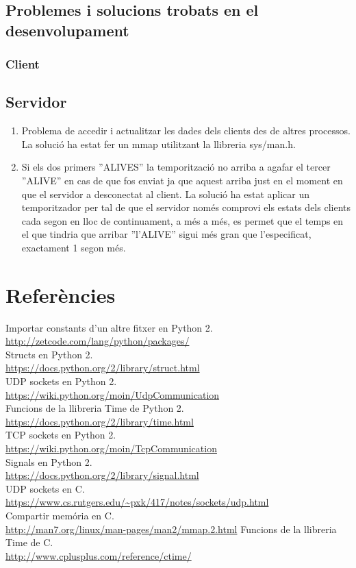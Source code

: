 \documentclass[11pt]{article}
\begin{document}
	\subsection{Problemes i solucions trobats en el desenvolupament}
		\subsubsection*{Client}
		\subsection*{Servidor}
\begin{enumerate}
\item Problema de accedir i actualitzar les dades dels clients des de altres processos. La solució ha estat fer un mmap utilitzant la llibreria sys/man.h. 
\item Si els dos primers ''ALIVES'' la temporització no arriba a agafar el tercer ''ALIVE'' en cas de que fos enviat ja que aquest arriba just en el moment en que el servidor a desconectat al client. La solució ha estat aplicar un temporitzador per tal de que el servidor només comprovi els estats dels clients cada segon en lloc de continuament, a més a més, es permet que el temps en el que tindria que arribar ''l'ALIVE'' sigui més gran que l'especificat, exactament 1 segon més.
\end{enumerate}
\newpage
\section{Referències}
Importar constants d'un altre fitxer en Python 2.\\
\url{http://zetcode.com/lang/python/packages/}\\
Structs en Python 2.\\
\url{https://docs.python.org/2/library/struct.html}\\
UDP sockets en Python 2.\\
\url{https://wiki.python.org/moin/UdpCommunication}\\
Funcions de la llibreria Time de Python 2.\\	
\url{https://docs.python.org/2/library/time.html}\\
TCP sockets en Python 2.\\
\url{https://wiki.python.org/moin/TcpCommunication}\\
Signals en Python 2.\\	
\url{https://docs.python.org/2/library/signal.html}\\
UDP sockets en C.\\
\url{https://www.cs.rutgers.edu/~pxk/417/notes/sockets/udp.html}\\
Compartir memória en C.\\
\url{http://man7.org/linux/man-pages/man2/mmap.2.html}
Funcions de la llibreria Time de C.\\
\url{http://www.cplusplus.com/reference/ctime/}
\end{document}
